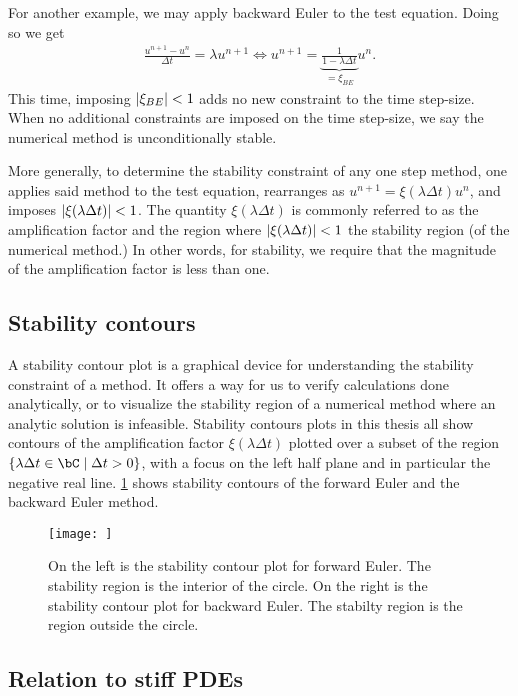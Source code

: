 For another example, we may apply backward Euler to the test equation. Doing so we get 
\begin{align}
\frac{u^{n+1} - u^n}{\Delta t} = \lambda u^{n+1} 
\iff 
u^{n+1} = \underbrace{\frac{1}{1 - \lambda\Delta t}}_{=\xi_{BE}} u^n.
\end{align}
This time, imposing $\left|\xi_{BE}\right|<1$ adds no new constraint to the time step-size. When no additional constraints are imposed on the time step-size, we say the numerical method is unconditionally stable.

More generally, to determine the stability constraint of any one step method, one applies said method to the test equation, rearranges as $u^{n+1} = \xi(\lambda\Delta t) u^n$, and imposes $\left|\xi(\lambda\Delta t)\right| < 1$. The quantity $\xi(\lambda\Delta t)$ is commonly referred to as the amplification factor and the region where $\left|\xi(\lambda\Delta t)\right| < 1$ the stability region (of the numerical method.) In other words, for stability, we require that the magnitude of the amplification factor is less than one.
 
\subsection{Stability contours}
A stability contour plot is a graphical device for understanding the stability constraint of a method. It offers a way for us to verify calculations done analytically, or to visualize the stability region of a numerical method where an analytic solution is infeasible. Stability contours plots in this thesis all show contours of the amplification factor $\xi(\lambda\Delta t)$ plotted over a subset of the region $\{\lambda\Delta t \in \bC \mid \Delta t > 0\}$, with a focus on the left half plane and in particular the negative real line. \cref{fig:FE BE stab cont} shows stability contours of the forward Euler and the backward Euler method.

\begin{figure}[htb!]
	\centering
\texttt{[image: ]}
\caption[Examples of stability contour plots.]{On the left is the stability contour plot for forward Euler. The stability region is the interior of the circle. On the right is the stability contour plot for backward Euler. The stabilty region is the region outside the circle.}
\label{fig:FE BE stab cont}
\end{figure}

\subsection{Relation to stiff PDEs}

